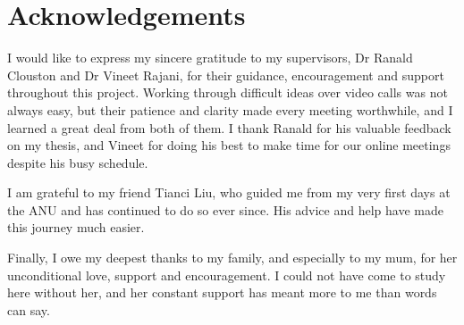\chapter*{Acknowledgements}
I would like to express my sincere gratitude to my supervisors, Dr Ranald Clouston and Dr Vineet Rajani, 
for their guidance, encouragement and support throughout this project.
Working through difficult ideas over video calls was not always easy, but their patience and clarity made every meeting worthwhile, and I learned a great deal from both of them.
I thank Ranald for his valuable feedback on my thesis, and Vineet for doing his best to make time for our online meetings despite his busy schedule.

I am grateful to my friend Tianci Liu, who guided me from my very first days at the ANU and has continued to do so ever since. His advice and help have made this journey much easier.

Finally, I owe my deepest thanks to my family, and especially to my mum, for her unconditional love, support and encouragement. I could not have come to study here without her, and her constant support has meant more to me than words can say.